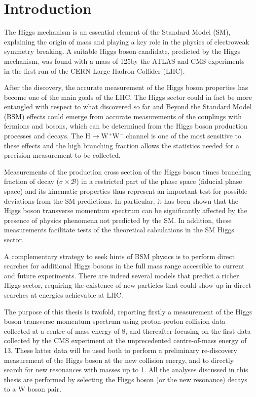 \chapter*{Introduction}
\thispagestyle{empty}

The Higgs mechanism is an essential element of the Standard Model (SM), explaining the origin of mass and playing a key role in the physics of electroweak symmetry breaking. A suitable Higgs boson candidate, predicted by the Higgs mechanism, was found with a mass of 125\GeV by the ATLAS and CMS experiments in the first run of the CERN Large Hadron Collider (LHC).

After the discovery, the accurate measurement of the Higgs boson properties has become one of the main goals of the LHC. The Higgs sector could in fact be more entangled with respect to what discovered so far and Beyond the Standard Model (BSM) effects could emerge from accurate measurements of the couplings with fermions and bosons, which can be determined from the Higgs boson production processes and decays. The $\mathrm{H \to W^+W^-}$ channel is one of the most sensitive to these effects and the high branching fraction allows the statistics needed for a precision measurement to be collected.

Measurements of the production cross section of the Higgs boson times branching fraction of decay ($\sigma\times\mathcal{B}$) in a restricted part of the phase space (fiducial phase space) and its kinematic properties thus represent an important test for possible deviations from the SM predictions.
In particular, it has been shown that the Higgs boson transverse momentum spectrum can be significantly affected by the presence of physics phenomena not predicted by the SM. In addition, these measurements facilitate tests of the theoretical calculations in the SM Higgs sector.

A complementary strategy to seek hints of BSM physics is to perform direct searches for additional Higgs bosons in the full mass range accessible to current and future experiments. There are indeed several models that predict a richer Higgs sector, requiring the existence of new particles that could show up in direct searches at energies achievable at LHC.

The purpose of this thesis is twofold, reporting firstly a measurement of the Higgs boson transverse momentum spectrum using proton-proton collision data collected at a centre-of-mass energy of 8\TeV, and thereafter focusing on the first data collected by the CMS experiment at the unprecedented centre-of-mass energy of 13\TeV. These latter data will be used both to perform a preliminary re-discovery measurement of the Higgs boson at the new collision energy, and to directly search for new resonances with masses up to 1\TeV. All the analyses discussed in this thesis are performed by selecting the Higgs boson (or the new resonance) decays to a W boson pair.

